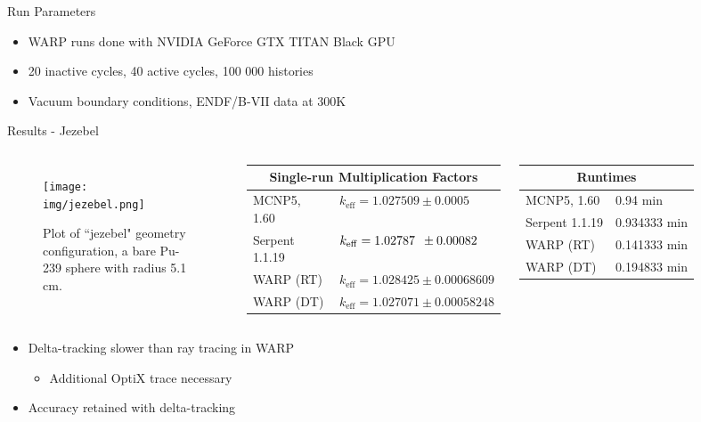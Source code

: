 \documentclass[final]{beamer}
\begin{document}
\begin{frame}{}
\begin{columns}[t]
\begin{column}{.3\linewidth}
\begin{block}{\large Run Parameters}
\begin{itemize}
{			Magny-Cours processors}
			\item{WARP runs done with NVIDIA GeForce GTX TITAN Black GPU}
			\item{20 inactive cycles, 40 active cycles, 100 000 histories}
			\item{Vacuum boundary conditions, ENDF/B-VII data at 300K}
			\end{itemize}
        	\end{block}
			\vfill
		\begin{block}{\large Results - Jezebel}
\begin{columns}
	\begin{figure}[h!]
	\texttt{[image: img/jezebel.png]}
	\caption{\footnotesize Plot of ``jezebel" geometry configuration, a bare Pu-239 sphere
	with radius 5.1 cm.}
	\end{figure}
	\begin{table}[h]
	\begin{tabular}{ll}
	\multicolumn{2}{c}{Single-run Multiplication Factors} \\ \hline
	MCNP5, 1.60 & $k_{\mathrm{eff}} = 1.027509 \pm 0.0005$ \\
	Serpent 1.1.19 & $k_{\mathrm{eff}} = 1.02787\hspace*{0.5em}\pm 0.00082$ \\
	WARP (RT) & $k_{\mathrm{eff}} = 1.028425 \pm 0.00068609$ \\
	WARP (DT) & $k_{\mathrm{eff}} = 1.027071 \pm 0.00058248$
	\end{tabular}
	\end{table}
	\begin{table}[h]
	\begin{tabular}{ll}
	\multicolumn{2}{c}{Runtimes} \\ \hline
	MCNP5, 1.60 & 0.94 min \\
	Serpent 1.1.19 & 0.934333 min \\
	WARP (RT) & 0.141333 min \\ %
	WARP (DT) & 0.194833 min %
	\end{tabular}
	\end{table}
\end{columns}
	\begin{itemize}
	\item Delta-tracking slower than ray tracing in WARP
		\begin{itemize}
		\item Additional OptiX trace necessary
		\end{itemize}
	\item Accuracy retained with delta-tracking
	\end{itemize}
		\end{block}
	\vfill
      \end{column}


\end{columns}
\end{frame}
\end{document}
